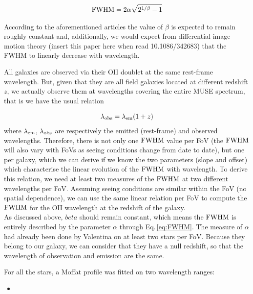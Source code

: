 \begin{equation}
	\rm{FWHM} = 2 \alpha \sqrt{2^{1/\beta} - 1 }
	\label{eq:FWHM}
\end{equation}

According to the aforementioned articles the value of $\beta$ is expected to remain roughly constant and, additionally, we would expect from differential image motion theory (insert this paper here when read 10.1086/342683) that the FWHM to linearly decrease with wavelength. 

All galaxies are observed via their OII doublet at the same rest-frame wavelength. But, given that they are all field galaxies located at different redshift $z$, we actually observe them at wavelengths covering the entire MUSE spectrum, that is we have the usual relation

\begin{equation}
	\lambda_{\rm{obs}} = \lambda_{\rm{em}} ( 1 + z )
\end{equation}
where $\lambda_{\rm{em}}$, $\lambda_{\rm{obs}}$ are respectively the emitted (rest-frame) and observed wavelengths. Therefore, there is not only one $\rm{FWHM}$ value per FoV (the $\rm{FWHM}$ will also vary with FoVs as seeing conditions change from date to date), but one per galaxy, which we can derive if we know the two parameters (slope and offset) which characterise the linear evolution of the $\rm{FWHM}$ with wavelength. To derive this relation, we need at least two measures of the $\rm{FWHM}$ at two different wavelengths per FoV. Assuming seeing conditions are similar within the FoV (no spatial dependence), we can use the same linear relation per FoV to compute the $\rm{FWHM}$ for the OII wavelength at the redshift of the galaxy. \\

As discussed above, $beta$ should remain constant, which means the $\rm{FWHM}$ is entirely described by the parameter $\alpha$ through Eq.\,\ref{eq:FWHM}. The measure of $\alpha$ had already been done by Valentina on at least two stars per FoV. Because they belong to our galaxy, we can consider that they have a null redshift, so that the wavelength of observation and emission are the same. 

For all the stars, a Moffat profile was fitted on two wavelength ranges:

\begin{itemize}
	\item 
\end{itemize}

